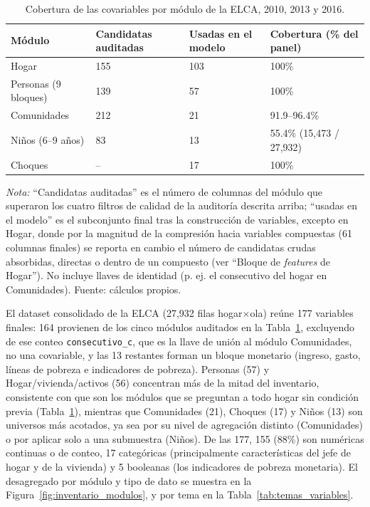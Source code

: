 \documentclass[12pt, letterpaper]{article}
\begin{document}
\begin{table}[H]
  \centering
  \caption{Cobertura de las covariables por módulo de la ELCA, 2010, 2013 y 2016.}
  \label{tab:cobertura_modulos}
  \footnotesize
  \begin{tabular}{lp{2.6cm}p{2.4cm}p{3.2cm}}
    \toprule
    \textbf{Módulo} & \textbf{Candidatas auditadas} & \textbf{Usadas en el modelo} & \textbf{Cobertura (\% del panel)} \\
    \midrule
    Hogar        & 155 & 103 & 100\% \\
    Personas (9 bloques) & 139 & 57  & 100\% \\
    Comunidades  & 212 & 21  & 91.9--96.4\% \\
    Niños (6--9 años) & 83 & 13 & 55.4\% (15{,}473 / 27{,}932) \\
    Choques      & --  & 17  & 100\% \\
    \bottomrule
  \end{tabular}
  \begin{minipage}{0.9\textwidth}
    \vspace{4pt}
    \footnotesize \textit{Nota:} ``Candidatas auditadas'' es el número de
    columnas del módulo que superaron los cuatro filtros de calidad de la
    auditoría descrita arriba; ``usadas en el modelo'' es el
    subconjunto final tras la construcción de variables, excepto
    en Hogar, donde por la magnitud de la compresión hacia variables
    compuestas (61 columnas finales) se reporta en cambio el número de
    candidatas crudas absorbidas, directas o dentro de un compuesto
    (ver ``Bloque de \emph{features} de Hogar''). No
    incluye llaves de identidad (p. ej. el consecutivo del hogar en
    Comunidades). Fuente: cálculos propios.
  \end{minipage}
\end{table}

El dataset consolidado de la ELCA (27{,}932 filas hogar$\times$ola) reúne
177 variables finales: 164 provienen de los cinco módulos auditados en la
Tabla~\ref{tab:cobertura_modulos}, excluyendo de ese conteo
\texttt{consecutivo\_c}, que es la llave de unión al módulo Comunidades,
no una covariable, y las 13 restantes forman un bloque monetario
(ingreso, gasto, líneas de pobreza e indicadores de pobreza). Personas
(57) y Hogar/vivienda/activos (56) concentran más de la mitad del
inventario, consistente con que son los módulos que se preguntan a todo
hogar sin condición previa (Tabla~\ref{tab:cobertura_modulos}), mientras
que Comunidades (21), Choques (17) y Niños (13) son universos más
acotados, ya sea por su nivel de agregación distinto (Comunidades) o por
aplicar solo a una submuestra (Niños). De las 177, 155 (88\%) son
numéricas continuas o de conteo, 17 categóricas (principalmente
características del jefe de hogar y de la vivienda) y 5 booleanas (los
indicadores de pobreza monetaria). El desagregado por módulo y tipo de
dato se muestra en la Figura~\ref{fig:inventario_modulos}, y por tema en
la Tabla~\ref{tab:temas_variables}.
\end{document}
